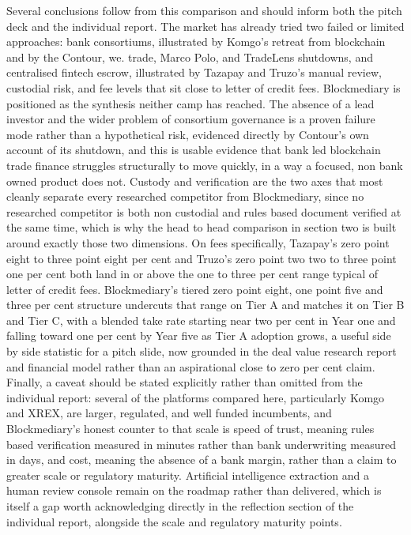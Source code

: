 \documentclass[12pt, a4paper]{article}
\begin{document}
Several conclusions follow from this comparison and should inform both the pitch deck and
the individual report. The market has already tried two failed or limited approaches:
bank consortiums, illustrated by Komgo's retreat from blockchain and by the Contour, we.
trade, Marco Polo, and TradeLens shutdowns, and centralised fintech escrow, illustrated by
Tazapay and Truzo's manual review, custodial risk, and fee levels that sit close to letter
of credit fees. Blockmediary is positioned as the synthesis neither camp has reached. The
absence of a lead investor and the wider problem of consortium governance is a proven
failure mode rather than a hypothetical risk, evidenced directly by Contour's own account
of its shutdown, and this is usable evidence that bank led blockchain trade finance
struggles structurally to move quickly, in a way a focused, non bank owned product does
not. Custody and verification are the two axes that most cleanly separate every researched
competitor from Blockmediary, since no researched competitor is both non custodial and
rules based document verified at the same time, which is why the head to head comparison in
section two is built around exactly those two dimensions. On fees specifically, Tazapay's
zero point eight to three point eight per cent and Truzo's zero point two two to three
point one per cent both land in or above the one to three per cent range typical of letter
of credit fees. Blockmediary's tiered zero point eight, one point five and three per cent
structure undercuts that range on Tier A and matches it on Tier B and Tier C, with a
blended take rate starting near two per cent in Year one and falling toward one per cent
by Year five as Tier A adoption grows, a useful side by side statistic for a pitch slide,
now grounded in the deal value research report and financial model rather than an
aspirational close to zero per cent claim. Finally, a caveat should
be stated explicitly rather than omitted from the individual report: several of the
platforms compared here, particularly Komgo and XREX, are larger, regulated, and well
funded incumbents, and Blockmediary's honest counter to that scale is speed of trust,
meaning rules based verification measured in minutes rather than bank underwriting
measured in days, and cost, meaning the absence of a bank margin, rather than a claim to
greater scale or regulatory maturity. Artificial intelligence extraction and a human
review console remain on the roadmap rather than delivered, which is itself a gap worth
acknowledging directly in the reflection section of the individual report, alongside the
scale and regulatory maturity points.

\newpage


\end{document}
